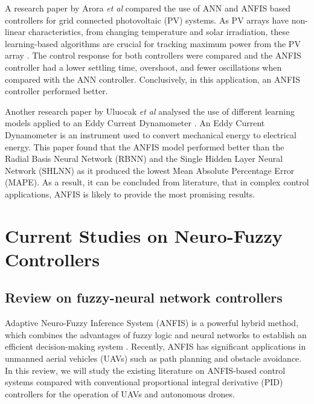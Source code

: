 A research paper by Arora \textit{et al} compared the use of ANN and ANFIS based controllers for grid connected photovoltaic (PV) systems. As PV arrays have non-linear characteristics, from changing temperature and solar irradiation, these learning-based algorithms are crucial for tracking maximum power from the PV array \cite{zain9}. The control response for both controllers were compared and the ANFIS controller had a lower settling time, overshoot, and fewer oscillations when compared with the ANN controller. Conclusively, in this application, an ANFIS controller performed better. 

Another research paper by Uluocak \textit{et al} analysed the use of different learning models applied to an Eddy Current Dynamometer \cite{zain10}. An Eddy Current Dynamometer is an instrument used to convert mechanical energy to electrical energy. This paper found that the ANFIS model performed better than the Radial Basis Neural Network (RBNN) and the Single Hidden Layer Neural Network (SHLNN) as it produced the lowest Mean Absolute Percentage Error (MAPE). As a result, it can be concluded from literature, that in complex control applications, ANFIS is likely to provide the most promising results. 
\section{Current Studies on Neuro-Fuzzy Controllers}
\subsection{Review on fuzzy-neural network controllers} 
Adaptive Neuro-Fuzzy Inference System (ANFIS) is a powerful hybrid method, which combines the advantages of fuzzy logic and neural networks to establish an efficient decision-making system \cite{boxi1}. Recently, ANFIS has significant applications in unmanned aerial vehicles (UAVs) such as path planning and obstacle avoidance. In this review, we will study the existing literature on ANFIS-based control systems compared with conventional proportional integral derivative (PID) controllers for the operation of UAVs and autonomous drones. 

